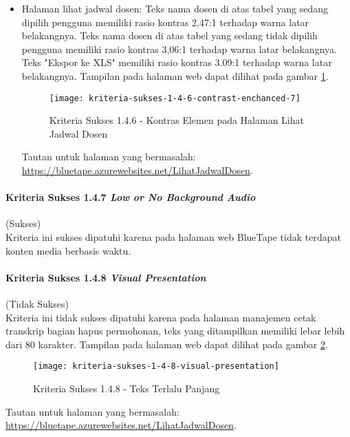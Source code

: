 \begin{itemize}
    \item Halaman lihat jadwal dosen: Teks nama dosen di atas tabel yang sedang dipilih pengguna memiliki rasio kontras 2,47:1 terhadap warna latar belakangnya. Teks nama dosen di atas tabel yang sedang tidak dipilih pengguna memiliki rasio kontras 3,06:1 terhadap warna latar belakangnya. Teks "Ekspor ke XLS" memiliki rasio kontras 3.09:1 terhadap warna latar belakangnya. Tampilan pada halaman web dapat dilihat pada gambar \ref{fig:1.4.6_contrast_enchanced_7}.
    \begin{figure}[H]
        \centering  
        \texttt{[image: kriteria-sukses-1-4-6-contrast-enchanced-7]}  
        \caption[Kriteria Sukses 1.4.6 - Kontras Elemen pada Halaman Lihat Jadwal Dosen]{Kriteria Sukses 1.4.6 - Kontras Elemen pada Halaman Lihat Jadwal Dosen}
        \label{fig:1.4.6_contrast_enchanced_7}  
    \end{figure} 
    Tautan untuk halaman yang bermasalah: \url{https://bluetape.azurewebsites.net/LihatJadwalDosen}.
\end{itemize}

\paragraph{Kriteria Sukses 1.4.7 \textit{Low or No Background Audio}}
\label{par:kepatuhan_bluetape_kriteria_sukses_1.4.7}
(Sukses)\\

Kriteria ini sukses dipatuhi karena pada halaman web BlueTape tidak terdapat konten media berbasis waktu.

\paragraph{Kriteria Sukses 1.4.8 \textit{Visual Presentation}}
\label{par:kepatuhan_bluetape_kriteria_sukses_1.4.8}
(Tidak Sukses)\\

Kriteria ini tidak sukses dipatuhi karena pada halaman manajemen cetak transkrip bagian hapus permohonan, teks yang ditampilkan memiliki lebar lebih dari 80 karakter. Tampilan pada halaman web dapat dilihat pada gambar \ref{fig:1.4.8_visual_presentation}.

\begin{figure}[H]
    \centering  
    \texttt{[image: kriteria-sukses-1-4-8-visual-presentation]}  
    \caption[Kriteria Sukses 1.4.8 - Teks Terlalu Panjang]{Kriteria Sukses 1.4.8 - Teks Terlalu Panjang}
    \label{fig:1.4.8_visual_presentation}  
\end{figure} 
Tautan untuk halaman yang bermasalah: \url{https://bluetape.azurewebsites.net/LihatJadwalDosen}.

